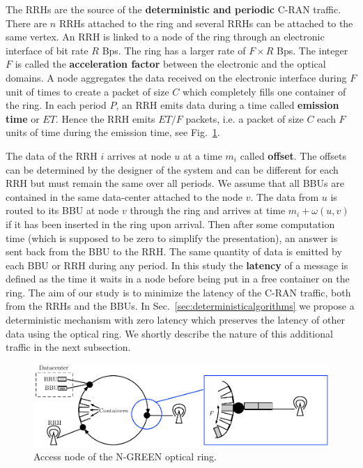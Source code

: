 \documentclass[]{llncs}
\begin{document}
   The RRHs are the source of the {\bf deterministic and periodic} C-RAN traffic.
   There are $n$ RRHs attached to the ring and several RRHs can be attached to the same vertex. An RRH is linked to a node of the ring through an electronic interface of bit rate $R$ Bps.
   The ring has a larger rate of $F\times R$ Bps. The integer $F$ is called the {\bf acceleration factor} between the electronic and the optical domains. A node aggregates the data received on the electronic interface during $F$ unit of times to create a packet of size $C$ which completely fills one container of the ring. 
  In each period $P$, an RRH emits data during a time called \textbf{emission time} or $ET$. Hence the RRH emits $ET / F$ packets, i.e. a packet of size $C$ each $F$ units of time during the emission time, see Fig.~\ref{fig:interface}.
   
   The data of the RRH $i$ arrives at node $u$ at a time $m_i$ called {\bf offset}. The offsets can be determined 
   by the designer of the system and can be different for each RRH but must remain the same over all periods. We assume that all 
   BBUs are contained in the same data-center attached to the node $v$. The data from $u$ is routed to its BBU at node $v$ through the ring and arrives at time $m_i + \omega(u,v)$ if it has been inserted in the ring upon arrival. Then after some computation time (which is supposed to be zero to simplify the presentation), an answer is sent back from the BBU to the RRH. The same quantity of data is emitted by each BBU or RRH during any period.
   In this study the {\bf latency} of a message is defined as the time it waits in a node before being put in a free container on the ring.
   The aim of our study is to minimize the latency of the C-RAN traffic, both from the RRHs and the BBUs. 
   In Sec.~\ref{sec:deterministicalgorithms} we propose a deterministic mechanism with zero latency which preserves the latency of other data using the optical ring. We shortly describe the nature of this additional traffic in the next subsection.
   
    
\begin{figure}[h!]
\begin{center}   

      \includegraphics[scale=0.7]{interface.pdf}
     \caption{Access node of the N-GREEN optical ring.}\label{fig:interface}
     
\end{center}
  \end{figure}
\end{document}
